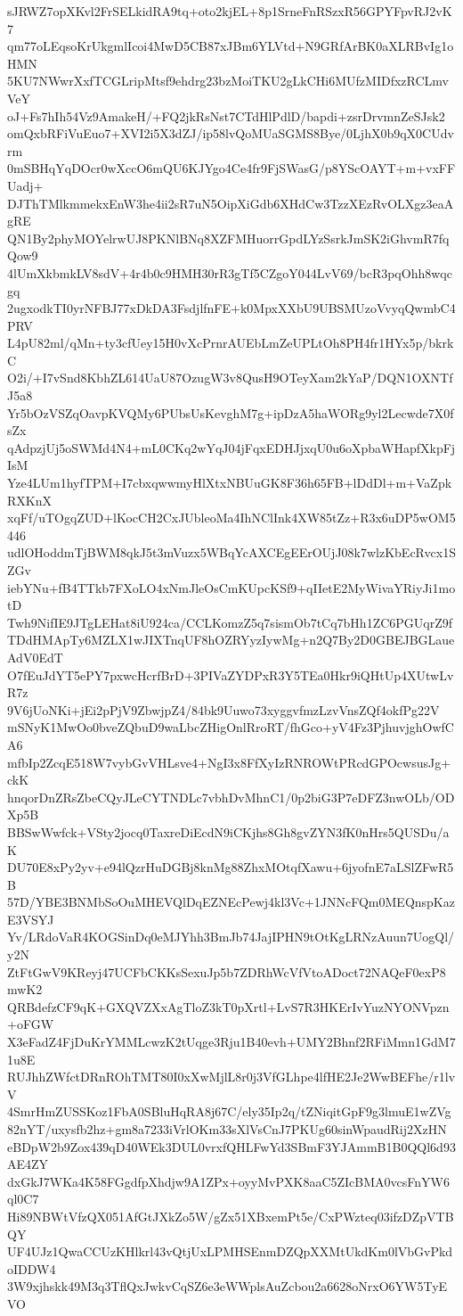 sJRWZ7opXKvl2FrSELkidRA9tq+oto2kjEL+8p1SrneFnRSzxR56GPYFpvRJ2vK7
qm77oLEqsoKrUkgmlIcoi4MwD5CB87xJBm6YLVtd+N9GRfArBK0aXLRBvIg1oHMN
5KU7NWwrXxfTCGLripMtsf9ehdrg23bzMoiTKU2gLkCHi6MUfzMIDfxzRCLmvVeY
oJ+Fs7hIh54Vz9AmakeH/+FQ2jkRsNst7CTdHlPdlD/bapdi+zsrDrvmnZeSJsk2
omQxbRFiVuEuo7+XVI2i5X3dZJ/ip58lvQoMUaSGMS8Bye/0LjhX0b9qX0CUdvrm
0mSBHqYqDOcr0wXccO6mQU6KJYgo4Ce4fr9FjSWasG/p8YScOAYT+m+vxFFUadj+
DJThTMlkmmekxEnW3he4ii2sR7uN5OipXiGdb6XHdCw3TzzXEzRvOLXgz3eaAgRE
QN1By2phyMOYelrwUJ8PKNlBNq8XZFMHuorrGpdLYzSsrkJmSK2iGhvmR7fqQow9
4lUmXkbmkLV8sdV+4r4b0c9HMH30rR3gTf5CZgoY044LvV69/bcR3pqOhh8wqcgq
2ugxodkTI0yrNFBJ77xDkDA3FsdjlfnFE+k0MpxXXbU9UBSMUzoVvyqQwmbC4PRV
L4pU82ml/qMn+ty3cfUey15H0vXcPrnrAUEbLmZeUPLtOh8PH4fr1HYx5p/bkrkC
O2i/+I7vSnd8KbhZL614UaU87OzugW3v8QusH9OTeyXam2kYaP/DQN1OXNTfJ5a8
Yr5bOzVSZqOavpKVQMy6PUbsUsKevghM7g+ipDzA5haWORg9yl2Lecwde7X0fsZx
qAdpzjUj5oSWMd4N4+mL0CKq2wYqJ04jFqxEDHJjxqU0u6oXpbaWHapfXkpFjIsM
Yze4LUm1hyfTPM+I7cbxqwwmyHlXtxNBUuGK8F36h65FB+lDdDl+m+VaZpkRXKnX
xqFf/uTOgqZUD+lKocCH2CxJUbleoMa4IhNClInk4XW85tZz+R3x6uDP5wOM5446
udlOHoddmTjBWM8qkJ5t3mVuzx5WBqYcAXCEgEErOUjJ08k7wlzKbEcRvcx1SZGv
iebYNu+fB4TTkb7FXoLO4xNmJleOsCmKUpcKSf9+qIIetE2MyWivaYRiyJi1motD
Twh9NifIE9JTgLEHat8iU924ca/CCLKomzZ5q7sismOb7tCq7bHh1ZC6PGUqrZ9f
TDdHMApTy6MZLX1wJIXTnqUF8hOZRYyzIywMg+n2Q7By2D0GBEJBGLaueAdV0EdT
O7fEuJdYT5ePY7pxwcHcrfBrD+3PIVaZYDPxR3Y5TEa0Hkr9iQHtUp4XUtwLvR7z
9V6jUoNKi+jEi2pPjV9ZbwjpZ4/84bk9Uuwo73xyggvfmzLzvVnsZQf4okfPg22V
mSNyK1MwOo0bveZQbuD9waLbcZHigOnlRroRT/fhGco+yV4Fz3PjhuvjghOwfCA6
mfbIp2ZcqE518W7vybGvVHLsve4+NgI3x8FfXyIzRNROWtPRcdGPOcwsusJg+ckK
hnqorDnZRsZbeCQyJLeCYTNDLc7vbhDvMhnC1/0p2biG3P7eDFZ3nwOLb/ODXp5B
BBSwWwfck+VSty2jocq0TaxreDiEcdN9iCKjhs8Gh8gvZYN3fK0nHrs5QUSDu/aK
DU70E8xPy2yv+e94lQzrHuDGBj8knMg88ZhxMOtqfXawu+6jyofnE7aLSlZFwR5B
57D/YBE3BNMbSoOuMHEVQlDqEZNEcPewj4kl3Vc+1JNNcFQm0MEQnspKazE3VSYJ
Yv/LRdoVaR4KOGSinDq0eMJYhh3BmJb74JajIPHN9tOtKgLRNzAuun7UogQl/y2N
ZtFtGwV9KReyj47UCFbCKKsSexuJp5b7ZDRhWcVfVtoADoct72NAQeF0exP8mwK2
QRBdefzCF9qK+GXQVZXxAgTloZ3kT0pXrtl+LvS7R3HKErIvYuzNYONVpzn+oFGW
X3eFadZ4FjDuKrYMMLcwzK2tUqge3Rju1B40evh+UMY2Bhnf2RFiMmn1GdM71u8E
RUJhhZWfctDRnROhTMT80I0xXwMjlL8r0j3VfGLhpe4lfHE2Je2WwBEFhe/r1lvV
4SmrHmZUSSKoz1FbA0SBluHqRA8j67C/ely35Ip2q/tZNiqitGpF9g3lmuE1wZVg
82nYT/uxysfb2hz+gm8a7233iVrlOKm33sXlVsCnJ7PKUg60sinWpaudRij2XzHN
eBDpW2b9Zox439qD40WEk3DUL0vrxfQHLFwYd3SBmF3YJAmmB1B0QQl6d93AE4ZY
dxGkJ7WKa4K58FGgdfpXhdjw9A1ZPx+oyyMvPXK8aaC5ZIcBMA0vcsFnYW6ql0C7
Hi89NBWtVfzQX051AfGtJXkZo5W/gZx51XBxemPt5e/CxPWzteq03ifzDZpVTBQY
UF4UJz1QwaCCUzKHlkrl43vQtjUxLPMHSEnmDZQpXXMtUkdKm0lVbGvPkdoIDDW4
3W9xjhskk49M3q3TflQxJwkvCqSZ6e3eWWplsAuZcbou2a6628oNrxO6YW5TyEVO
